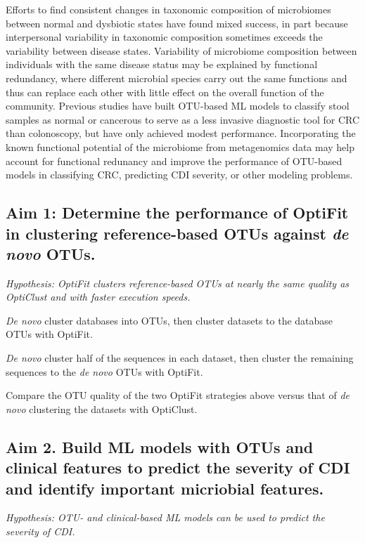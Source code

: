 \documentclass[11pt]{article}
\begin{document}
Efforts to find consistent changes in taxonomic composition of microbiomes
between normal and dysbiotic states have found mixed success, in part because
interpersonal variability in taxonomic composition sometimes exceeds the
variability between disease states.
Variability of microbiome composition between individuals with the same disease
status may be explained by functional redundancy, where different microbial
species carry out the same functions and thus can replace each other with little
effect on the overall function of the community.
Previous studies have built OTU-based ML models to classify stool
samples as normal or cancerous to serve as a less invasive diagnostic tool for
CRC than colonoscopy, but have only achieved modest performance.
Incorporating the known functional potential of the microbiome from metagenomics
data may help account for functional redunancy and improve the performance of
OTU-based models in classifying CRC, predicting CDI severity, or other modeling
problems.

\subsection*{Aim 1: Determine the performance of OptiFit in clustering reference-based OTUs against \textit{de novo} OTUs.}
\textit{Hypothesis: OptiFit clusters reference-based OTUs at nearly the same quality as OptiClust and with faster execution speeds.}

\begin{compactenum}[A.]
    \item \textit{De novo} cluster databases into OTUs, then cluster datasets to the database OTUs with OptiFit.
    \item \textit{De novo} cluster half of the sequences in each dataset, then cluster the remaining sequences to the \textit{de novo} OTUs with OptiFit.
    \item Compare the OTU quality of the two OptiFit strategies above versus that of \textit{de novo} clustering the datasets with OptiClust.
\end{compactenum}

\subsection*{Aim 2. Build ML models with OTUs and clinical features to predict the severity of CDI and identify important micriobial features.}
\textit{Hypothesis: OTU- and clinical-based ML models can be used to predict the severity of CDI.}
\end{document}
